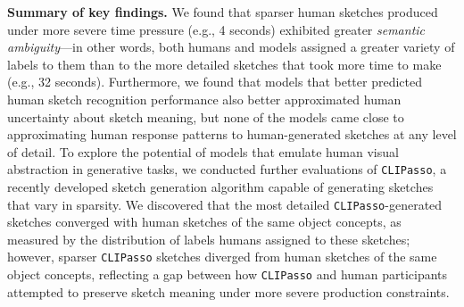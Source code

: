 \documentclass{article}
\begin{document}
\textbf{Summary of key findings.} We found that sparser human sketches produced under more severe time pressure (e.g., 4 seconds) exhibited greater \textit{semantic ambiguity}---in other words, both humans and models assigned a greater variety of labels to them than to the more detailed sketches that took more time to make (e.g., 32 seconds).
Furthermore, we found that models that better predicted human sketch recognition performance also better approximated human uncertainty about sketch meaning, but none of the models came close to approximating human response patterns to human-generated sketches at any level of detail. 
To explore the potential of models that emulate human visual abstraction in generative tasks, we conducted further evaluations of \texttt{CLIPasso}, a recently developed sketch generation algorithm \cite{vinker2022clipasso} capable of generating sketches that vary in sparsity. 
We discovered that the most detailed \texttt{CLIPasso}-generated sketches converged with human sketches of the same object concepts, as measured by the distribution of labels humans assigned to these sketches; however, sparser \texttt{CLIPasso} sketches diverged from human sketches of the same object concepts, reflecting a gap between how \texttt{CLIPasso} and human participants attempted to preserve sketch meaning under more severe production constraints. 


\end{document}
